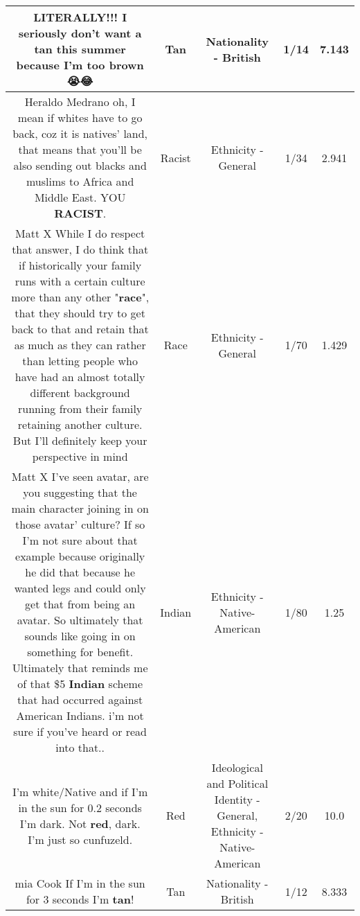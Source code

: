 \documentclass[11pt]{article}
\newlength\mylength
\begin{document}
\begin{center}
\begin{longtable}{|C{.65\mylength}|C{.30\mylength}|C{.12\mylength}|C{.12\mylength}|C{.12\mylength}|}
  \small LITERALLY!!! I seriously don't want a \textbf{tan} this summer because I'm too brown 😭😂\normalsize   & Tan & Nationality - British & 1/14 & 7.143 \\  \hline
  \small Heraldo Medrano oh, I mean if whites have to go back, coz it is natives' land, that means that you'll be also sending out blacks and muslims to Africa and Middle East. YOU \textbf{RACIST}.\normalsize   & Racist & Ethnicity - General & 1/34 & 2.941 \\  \hline
  \small Matt X While I do respect that answer, I do think that if historically your family runs with a certain culture more than any other "\textbf{race}", that they should try to get back to that and retain that as much as they can rather than letting people who have had an almost totally different background running from their family retaining another culture. But I'll definitely keep your perspective in mind\normalsize   & Race & Ethnicity - General & 1/70 & 1.429 \\  \hline
  \small Matt X I've seen avatar, are you suggesting that the main character joining in on those avatar' culture? If so I'm not sure about that example because originally he did that because he wanted legs and could only get that from being an avatar. So ultimately that sounds like going in on something for benefit. Ultimately that reminds me of that \$5 \textbf{Indian} scheme that had occurred against American Indians. i'm not sure if you've heard or read into that..\normalsize   & Indian & Ethnicity - Native-American & 1/80 & 1.25 \\  \hline
  \small I'm white/Native and if I'm in the sun for 0.2 seconds I'm dark. Not \textbf{r\textbf{ed}}, dark. I'm just so cunfuzeld.\normalsize   & Red &  Ideological and Political Identity - General, Ethnicity - Native-American & 2/20 & 10.0 \\  \hline
  \small mia Cook If I'm in the sun for 3 seconds I'm \textbf{tan}!\normalsize   & Tan & Nationality - British & 1/12 & 8.333 \\  \hline

\end{longtable}
\end{center}
\end{document}
